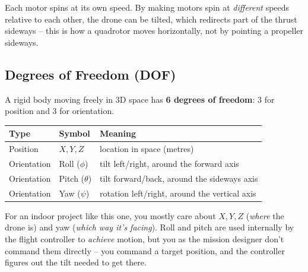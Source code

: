 \documentclass[11pt,a4paper]{article}
\begin{document}
\begin{center}
\end{center}

Each motor spins at its own speed. By making motors spin at \emph{different} speeds relative to
each other, the drone can be tilted, which redirects part of the thrust sideways -- this is how a
quadrotor moves horizontally, not by pointing a propeller sideways.

\subsection{Degrees of Freedom (DOF)}

A rigid body moving freely in 3D space has \textbf{6 degrees of freedom}: 3 for position and 3
for orientation.

\begin{center}
\small
\begin{tabular}{lll}
\toprule
\textbf{Type} & \textbf{Symbol} & \textbf{Meaning} \\
\midrule
Position & $X, Y, Z$ & location in space (metres) \\
Orientation & Roll ($\phi$) & tilt left/right, around the forward axis \\
Orientation & Pitch ($\theta$) & tilt forward/back, around the sideways axis \\
Orientation & Yaw ($\psi$) & rotation left/right, around the vertical axis \\
\bottomrule
\end{tabular}
\end{center}

For an indoor project like this one, you mostly care about $X, Y, Z$ (\emph{where} the drone is)
and yaw (\emph{which way it's facing}). Roll and pitch are used internally by the flight
controller to \emph{achieve} motion, but you as the mission designer don't command them directly
-- you command a target position, and the controller figures out the tilt needed to get there.
\end{document}
